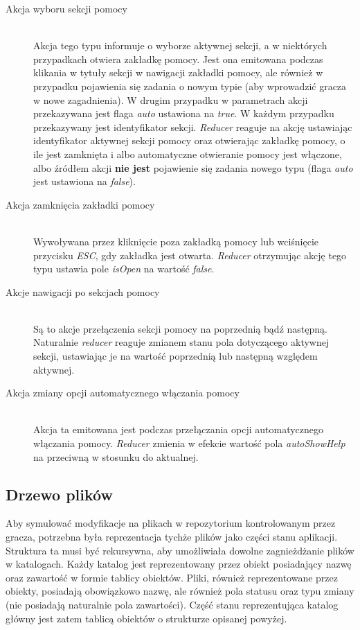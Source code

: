 \documentclass[12pt,a4paper,polish,thesis]{dcsbook}
\begin{document}
{\begin{description}
	\item[Akcja wyboru sekcji pomocy] \hfill \\
	Akcja tego typu informuje o wyborze aktywnej sekcji, a w niektórych przypadkach otwiera zakładkę pomocy. Jest ona emitowana podczas klikania w tytuły sekcji w nawigacji zakładki pomocy, ale również w przypadku pojawienia się zadania o nowym typie (aby wprowadzić gracza w nowe zagadnienia). W drugim przypadku w parametrach akcji przekazywana jest flaga \textit{auto} ustawiona na \textit{true}. W każdym przypadku przekazywany jest identyfikator sekcji. \textit{Reducer} reaguje na akcję ustawiając identyfikator aktywnej sekcji pomocy oraz otwierając zakładkę pomocy, o ile jest zamknięta i albo automatyczne otwieranie pomocy jest włączone, albo źródłem akcji \textbf{nie jest} pojawienie się zadania nowego typu (flaga \textit{auto} jest ustawiona na \textit{false}).
	
	\item[Akcja zamknięcia zakładki pomocy] \hfill \\
	Wywoływana przez kliknięcie poza zakładką pomocy lub wciśnięcie przycisku \textit{ESC}, gdy zakładka jest otwarta. \textit{Reducer} otrzymując akcję tego typu ustawia pole \textit{isOpen} na wartość \textit{false}.
	
	\item[Akcje nawigacji po sekcjach pomocy] \hfill \\
	Są to akcje przełączenia sekcji pomocy na poprzednią bądź następną. Naturalnie \textit{reducer} reaguje zmianem stanu pola dotyczącego aktywnej sekcji, ustawiając je na wartość poprzednią lub następną względem aktywnej.
	
	\item[Akcja zmiany opcji automatycznego włączania pomocy] \hfill \\
	Akcja ta emitowana jest podczas przełączania opcji automatycznego włączania pomocy. \textit{Reducer} zmienia w efekcie wartość pola \textit{autoShowHelp} na przeciwną w stosunku do aktualnej.
	\end{description}
	
	\subsection{Drzewo plików}
	
	Aby symulować modyfikacje na plikach w repozytorium kontrolowanym przez gracza, potrzebna była reprezentacja tychże plików jako części stanu aplikacji. Struktura ta musi być rekursywna, aby umożliwiała dowolne zagnieżdżanie plików w katalogach. Każdy katalog jest reprezentowany przez obiekt posiadający nazwę oraz zawartość w formie tablicy obiektów. Pliki, również reprezentowane przez obiekty, posiadają obowiązkowo nazwę, ale również pola statusu oraz typu zmiany (nie posiadają naturalnie pola zawartości). Część stanu reprezentująca katalog główny jest zatem tablicą obiektów o strukturze opisanej powyżej.
	
}
\end{document}
